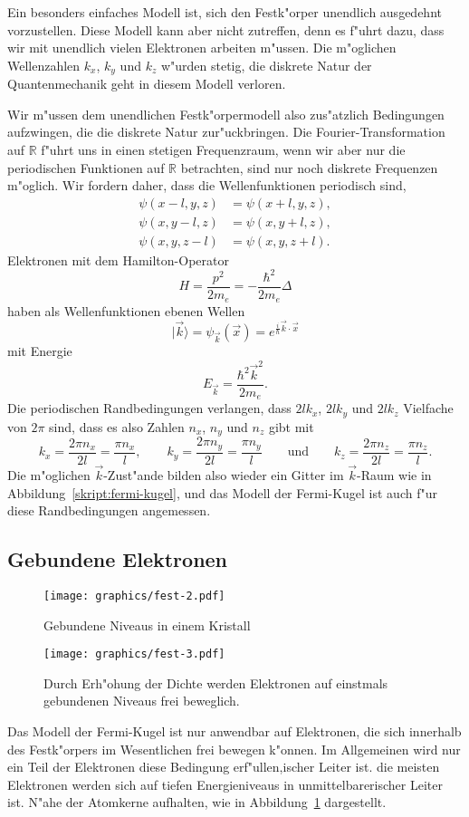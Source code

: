 Ein besonders einfaches Modell ist, sich den Festk"orper unendlich 
ausgedehnt vorzustellen. Diese Modell kann aber nicht zutreffen, denn
es f"uhrt dazu, dass wir mit unendlich vielen Elektronen arbeiten m"ussen.
Die m"oglichen Wellenzahlen $k_x$, $k_y$ und $k_z$ w"urden stetig, die
diskrete Natur der Quantenmechanik geht in diesem Modell verloren.

Wir m"ussen dem unendlichen Festk"orpermodell also zus"atzlich Bedingungen
aufzwingen, die die diskrete Natur zur"uckbringen. Die Fourier-Transformation
auf $\mathbb R$ f"uhrt uns in einen stetigen Frequenzraum, wenn wir
aber nur die periodischen Funktionen auf $\mathbb R$ betrachten, sind
nur noch diskrete Frequenzen m"oglich.
Wir fordern daher, dass die Wellenfunktionen periodisch sind,
\begin{align*}
\psi(x-l, y  ,z  )&=\psi(x+l,y  ,z  ),
\\
\psi(x  , y-l,z  )&=\psi(x  ,y+l,z  ),
\\
\psi(x  , y  ,z-l)&=\psi(x  ,y  ,z+l).
\end{align*}
Elektronen mit dem Hamilton-Operator 
\[
H=\frac{p^2}{2m_e}=-\frac{\hbar^2}{2m_e}\Delta
\]
haben als Wellenfunktionen ebenen Wellen
\[
|\vec k\rangle
=
\psi_{\vec k}(\vec x)
=
e^{\frac{i}{\hbar}\vec k\cdot \vec x}
\]
mit Energie
\[
E_{\vec k}=\frac{\hbar^2\vec k^2}{2m_e}.
\]
Die periodischen Randbedingungen verlangen, dass $2l k_x$, $2lk_y$ und $2lk_z$
Vielfache von $2\pi$ sind, dass es also Zahlen $n_x$, $n_y$ und $n_z$ gibt mit
\[
k_x=\frac{2\pi n_x}{2l}=\frac{\pi n_x}{l},\qquad
k_y=\frac{2\pi n_y}{2l}=\frac{\pi n_y}{l}\qquad\text{und}\qquad
k_z=\frac{2\pi n_z}{2l}=\frac{\pi n_z}{l}.
\]
Die m"oglichen $\vec k$-Zust"ande bilden also wieder ein Gitter im
$\vec k$-Raum wie in Abbildung~\ref{skript:fermi-kugel}, und das Modell
der Fermi-Kugel ist auch f"ur diese Randbedingungen angemessen.

\subsection{Gebundene Elektronen}
\begin{figure}
\centering
\texttt{[image: graphics/fest-2.pdf]}
\caption{Gebundene Niveaus in einem Kristall
\label{skript:gebundene-niveaus}}
\end{figure}
\begin{figure}
\centering
\texttt{[image: graphics/fest-3.pdf]}
\caption{Durch Erh"ohung der Dichte werden Elektronen auf einstmals
gebundenen Niveaus frei beweglich.
\label{skript:gebundene-niveaus-komprimiert}}
\end{figure}
Das Modell der Fermi-Kugel ist nur anwendbar auf Elektronen, die sich
innerhalb des Festk"orpers im Wesentlichen frei bewegen k"onnen.
Im Allgemeinen wird nur ein Teil der Elektronen diese Bedingung erf"ullen,ischer Leiter ist.
die meisten Elektronen werden sich auf tiefen Energieniveaus in unmittelbarerischer Leiter ist.
N"ahe der Atomkerne aufhalten, wie in Abbildung~\ref{skript:gebundene-niveaus}
dargestellt.

